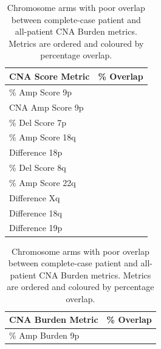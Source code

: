 \begin{table}[!ht]
    \begin{minipage}{.49\linewidth}
      \caption[Chromosome arms with poor overlap between complete-case patient and all-patient CNA Score metrics.]{Chromosome arms with poor overlap between complete-case patient and all-patient CNA Score metrics. Metrics are ordered and coloured by percentage overlap.}
      \centering 
\begin{tabular}[t]{l>{}r}
\toprule
CNA Score Metric & \% Overlap\\
\midrule
\% Amp Score 9p & \cellcolor[HTML]{414487}{\textcolor{white}{11.00}}\\
 
CNA Amp Score 9p & \cellcolor[HTML]{443C84}{\textcolor{white}{16.69}}\\
 
\% Del Score 7p & \cellcolor[HTML]{481F70}{\textcolor{white}{42.65}}\\
 
\% Amp Score 18q & \cellcolor[HTML]{481466}{\textcolor{white}{55.59}}\\
 
Difference 18p & \cellcolor[HTML]{450458}{\textcolor{white}{74.15}}\\
 
\% Del Score 8q & \cellcolor[HTML]{450457}{\textcolor{white}{75.14}}\\
 
\% Amp Score 22q & \cellcolor[HTML]{440256}{\textcolor{white}{76.71}}\\
 
Difference Xq & \cellcolor[HTML]{440155}{\textcolor{white}{77.85}}\\
 
Difference 18q & \cellcolor[HTML]{440155}{\textcolor{white}{78.80}}\\
 
Difference 19p & \cellcolor[HTML]{440154}{\textcolor{white}{79.10}}\\
\bottomrule
\end{tabular} \label{table:CNAScoreT2}
    \end{minipage}%
    \hspace{0.3cm}
    \begin{minipage}{.49\linewidth}
      \centering
      \caption[Chromosome arms with poor overlap between complete-case patient and all-patient CNA Burden metrics.]{Chromosome arms with poor overlap between complete-case patient and all-patient CNA Burden metrics. Metrics are ordered and coloured by percentage overlap.}
\begin{tabular}[t]{l>{}r}
\toprule
CNA Burden Metric & \% Overlap\\
\midrule
\% Amp Burden 9p & \cellcolor[HTML]{414487}{\textcolor{white}{10.84}}\\
 

\end{tabular}
\end{minipage}
\end{table}
